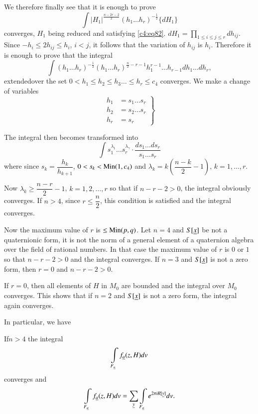 We therefore finally see that it is enough to prove
$$
\int |H_{1}|^{\frac{n-2r-2}{2}}(h_{1}\ldots
h_{r})^{-\frac{1}{2}}\{dH_{1}\}
$$
converges, $H_{1}$ being reduced and satisfying
\eqref{c4:eq82}. $dH_{1}=\prod\limits_{1\leq i\leq j\leq r}dh_{ij}$. Since
$-h_{i}\leq 2h_{ij}\leq h_{i}$, $i<j$, it follows that the variation
of $h_{ij}$ is $h_{i}$. Therefore it is enough to prove that the
integral 
$$ 
\int (h_{1}\ldots h_{r})^{-\frac{1}{2}}(h_{1}\ldots
h_{r})^{\frac{n}{2}-r-1}h^{r-1}_{1}\ldots h_{r-1}dh_{1}\ldots dh_{r},
$$
extended\pageoriginale over the set $0<h_{1}\leq h_{2}\leq
h_{3}\ldots\leq h_{r}\leq c_{4}$ converges. We make a change of
variables
\begin{equation*}
\left.
\begin{aligned}
h_{1} &= s_{1}\ldots s_{r}\\
h_{2} &= s_{2}\ldots s_{r}\\
h_{r} &= s_{r}
\end{aligned}
\right\}\tag{84}\label{c4:eq84}
\end{equation*}

The integral then becomes transformed into 
\begin{equation*}
\int s^{\lambda_{1}}_{1}\ldots s^{\lambda_{\gamma}}_{r}\cdot
\frac{ds_{1}\ldots ds_{r}}{s_{1}\ldots s_{r}}\tag{85}\label{c4:eq85}
\end{equation*}
where since $s_{k}=\dfrac{h_{k}}{h_{k+1}}$, $0<s_{k}<\operatorname{Min} (1,c_{4})$
and $\lambda_{k}=k\left(\dfrac{n-k}{2}-1\right)$, $k=1,\ldots,r$.

Now $\lambda_{k}\geq \dfrac{n-r}{2}-1$, $k=1,2,\ldots,r$ so that if
$n-r-2>0$, the integral obviously converges. If $n>4$, since $r\leq
\dfrac{n}{2}$, this condition is satisfied and the integral converges.

Now the maximum value of $r$ is $\leq \operatorname{Min} (p,q)$. Let $n=4$ and
$S[\underline{x}]$ be not a quaternionic form, \iec it is not the norm of a
general element of a quaternion algebra over the field of rational
numbers. In that case the maximum value of $r$ is $0$ or $1$ so that
$n-r-2>0$ and the integral converges. If $n=3$ and $S[\underline{x}]$ is not
a zero form, then $r=0$ and $n-r-2>0$.

If $r=0$, then all elements of $H$ in $M_{0}$ are bounded and the
integral over $M_{0}$ converges. This shows that if $n=2$ and
$S[\underline{x}]$ is not a zero form, the integral again converges. 

In particular, we have 

\begin{thm}\label{chap4:thm4}
If\pageoriginale $n>4$ the integral
$$
\int\limits_{F_{\underline{a}}}f_{\underline{a}}(z,H)dv
$$
converges and
$$
\int\limits_{F_{\underline{a}}}f_{\underline{a}}(z,H)dv=\sum_{\underline{y}}\int\limits_{F_{\underline{a}}}e^{2\pi
  iR[\underline{y}]}dv. 
$$
\end{thm}

